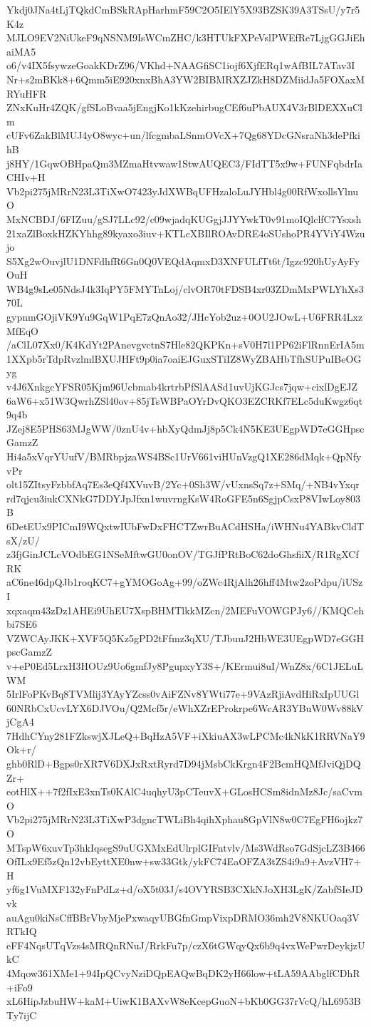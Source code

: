Ykdj0JNa4tLjTQkdCmBSkRApHarhmF59C2O5IElY5X93BZSK39A3TSsU/y7r5K4z
MJLO9EV2NiUkeF9qNSNM9IsWCmZHC/k3HTUkFXPeVslPWEfRe7LjgGGJiEhaiMA5
o6/v4IX5fsywzeGoakKDrZ96/VKhd+NAAGfiSC1iojf6XjfERq1wAfBIL7ATav3I
Nr+s2mBKk8+6Qmm5iE920xnxBhA3YW2BIBMRXZJZkH8DZMiidJa5FOXaxMRYuHFR
ZNxKuHr4ZQK/gfSLoBvaa5jEngjKo1kKzehirbugCEf6uPbAUX4V3rBlDEXXuClm
cUFv6ZakBlMUJ4yO8wyc+un/lfcgmbaLSnmOVcX+7Qg68YDcGNsraNh3dePfkihB
j8HY/1GqwOBHpaQm3MZmaHtvwaw1StwAUQEC3/FIdTT5x9w+FUNFqbdrIaCHIv+H
Vb2pi275jMRrN23L3TiXwO7423yJdXWBqUFHzaloLuJYHbl4g00RfWxollsYlnuO
MxNCBDJ/6FIZuu/gSJ7LLc92/c09wjadqKUGgjJJYYwkT0v91moIQlclfC7Ysxsh
21xaZlBoxkHZKYhhg89kyaxo3iuv+KTLcXBIlROAvDRE4oSUshoPR4YViY4Wzujo
S5Xg2wOuvjlU1DNFdhfR6Gn0Q0VEQdAqmxD3XNFULfTt6t/Igzc920hUyAyFyOuH
WB4g9sLe05NdsJ4k3IqPY5FMYTnLoj/clvOR70tFDSB4xr03ZDmMxPWLYhXs370L
gypnmGOjiVK9Yu9GqW1PqE7zQnAo32/JHcYob2uz+0OU2JOwL+U6FRR4LxzMfEqO
/aClL07Xx0/K4KdYt2PAnevgvctnS7Hle82QKPKn+sV0H7l1PP62iFlRnnErIA5m
1XXpb5rTdpRvzlmlBXUJHFt9p0ia7oaiEJGuxSTiIZ8WyZBAHbTfhSUPuIBeOGyg
v4J6XnkgcYFSR05Kjm96Ucbmab4krtrbPfSlAASd1uvUjKGJcs7jqw+cixlDgEJZ
6aW6+x51W3QwrhZSl40ov+85jTsWBPaOYrDvQKO3EZCRKf7ELc5duKwgz6qt9q4b
JZej8E5PHS63MJgWW/0znU4v+hbXyQdmJj8p5Ck4N5KE3UEgpWD7eGGHpscGamzZ
Hi4a5xVqrYUufV/BMRbpjzaWS4BSc1UrV661viHUnVzgQ1XE286dMqk+QpNfyvPr
olt15ZItsyFzbbfAq7Es3eQf4XVuvB/2Yc+0Sh3W/vUxnsSq7z+SMq/+NB4vYxqr
rd7qjcu3iukCXNkG7DDYJpJfxn1wuvrngKsW4RoGFE5n6SgjpCsxP8VIwLoy803B
6DetEUx9PICmI9WQxtwIUbFwDxFHCTZwrBuACdHSHa/iWHNu4YABkvCldTsX/zU/
z3fjGinJCLcVOdbEG1NSeMftwGU0onOV/TGJfPRtBoC62doGhsfiiX/R1RgXCfRK
aC6ne46dpQJb1roqKC7+gYMOGoAg+99/oZWc4RjAlh26hff4Mtw2zoPdpu/iUSzI
xqxaqm43zDz1AHEi9UhEU7XspBHMTlkkMZcn/2MEFuVOWGPJy6//KMQCehbi7SE6
VZWCAyJKK+XVF5Q5Kz5gPD2tFfmz3qXU/TJbuuJ2HbWE3UEgpWD7eGGHpscGamzZ
v+eP0Ed5LrxH3HOUz9Uo6gmfJy8PgupxyY3S+/KErmui8uI/WnZ8x/6C1JELuLWM
5IrlFoPKvBq8TVMlij3YAyYZcss0vAiFZNv8YWti77e+9VAzRjiAvdHiRxIpUUGl
60NRbCxUcvLYX6DJVOu/Q2Mcf5r/eWhXZrEProkrpe6WcAR3YBuW0Wv88kVjCgA4
7HdhCYny281FZkswjXJLeQ+BqHzA5VF+iXkiuAX3wLPCMc4kNkK1RRVNaY9Ok+r/
ghb0RlD+Bgps0rXR7V6DXJxRxtRyrd7D94jMsbCkKrgn4F2BcmHQMfJviQjDQZr+
eotHlX++7f2fIxE3xnTs0KAlC4uqhyU3pCTeuvX+GLosHCSm8idnMz8Jc/saCvmO
Vb2pi275jMRrN23L3TiXwP3dgncTWLiBh4qihXphau8GpVlN8w0C7EgFH6ojkz7O
MTspW6xuvTp3hkIqsegS9uUGXMxEdUlrplGIFntvlv/Ms3WdRso7GdSjcLZ3B466
OfILx9Ef5zQn12vbEyttXE0nw+sw33Gtk/ykFC74EaOFZA3tZS4i9a9+AvzVH7+H
yf6g1VuMXF132yFnPdLz+d/oX5t03J/s4OVYRSB3CXkNJoXH3LgK/ZabfSIeJDvk
auAgu0kiNsCffBBrVbyMjePxwaqyUBGfnGmpVixpDRMO36mh2V8NKUOaq3VRTkIQ
eFF4NqsUTqVzs4sMRQnRNuJ/RrkFu7p/czX6tGWqyQx6b9q4vxWePwrDeykjzUkC
4Mqow361XMe1+94IpQCvyNziDQpEAQwBqDK2yH66low+tLA59AAbglfCDhR+iFo9
xL6HipJzbuHW+kaM+UiwK1BAXvW8eKcepGuoN+bKb0GG37rVcQ/hL6953BTy7ijC
